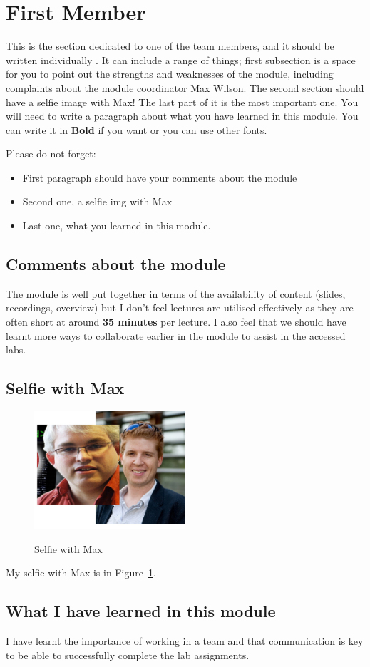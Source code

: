 \section{First Member}
This is the section dedicated to one of the team members, and it should be written individually . It can include a range of things; first subsection is a space for you to point out the strengths and weaknesses of the module, including complaints about the module coordinator Max Wilson. The second section should have a selfie image with Max! The last part of it is the most important one. You will need to write a paragraph about what you have learned in this module. You can write it in \textbf{Bold} if you want or you can use other fonts. 

Please do not forget:
\begin{itemize}
	\item First paragraph should have your comments about the module
	\item Second one, a selfie img with Max
	\item Last one, what you learned in this module.
\end{itemize}

\subsection{Comments about the module}
The module is well put together in terms of the availability of content (slides, recordings, overview) but I don't feel lectures are utilised effectively as they are often short at around \textbf{35 minutes} per lecture. I also feel that we should have learnt more ways to collaborate  earlier in the module to assist in the accessed labs.

\subsection{Selfie with Max}

\begin{figure}[h]
	\caption{Selfie with Max}
	\centering
	\includegraphics[width=0.5\textwidth]{selfieWithMax}
	\label{fig:selfie}
\end{figure}

My selfie with Max is in  Figure~\ref{fig:selfie}.

\subsection{What I have learned in this module}
I have learnt the importance of working in a team and that communication is key to be able to successfully complete the lab assignments. 


